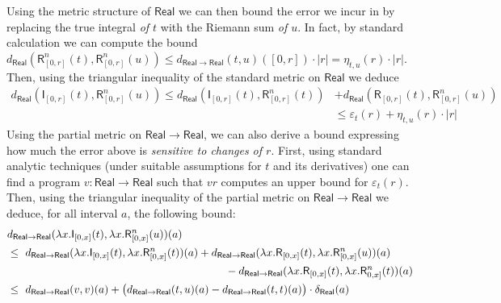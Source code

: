 \begin{example}
Using the metric structure of $\mathsf{Real}$ we can then bound the error we incur in by replacing the true integral \emph{of $t$} with the Riemann sum \emph{of $u$}. 
In fact, by standard calculation we can compute the bound
$d_{\mathsf{Real}} ( \mathsf{R}^{n}_{[0,r]}(t), \mathsf R^{n}_{[0,r]}(u))\leq 
d_{\mathsf{Real}\to\mathsf{Real}}(t, u)([0,r]) \cdot |r|=\eta_{t,u}(r) \cdot |r|$.
Then, using the triangular inequality of the standard metric on $\mathsf{Real}$ we deduce
\begin{align*}
 d_{\mathsf{Real}} ( \mathsf{I}_{[0,r]}(t), \mathsf R^{n}_{[0,r]}(u)) \leq
d_{\mathsf{Real}} ( \mathsf{I}_{[0,r]}(t), \mathsf R^{n}_{[0,r]}(t))  & +
d_{\mathsf{Real}} ( \mathsf{R}_{[0,r]}(t),\mathsf R^{n}_{[0,r]}(u)) \\
& \leq \varepsilon_{t}(r)
+ 
\eta_{t,u}(r)\cdot 
  |r|
 \end{align*}
 Using the partial metric on $\mathsf{Real}\to \mathsf{Real}$, we can also derive a bound expressing how much the error above is \emph{sensitive to changes of $r$}. 
First, using standard analytic techniques (under suitable assumptions for $t$ and its derivatives) one can find a program $v:\mathsf{Real}\to\mathsf{Real}$ such that $vr $ computes an upper bound for $\varepsilon_{t}(r)$. 
Then, using the triangular inequality of the partial metric on $\mathsf{Real}\to \mathsf{Real}$ we deduce, for all interval $a$, the following bound:
\begin{align*}
& d_{\mathsf{Real}\to\mathsf{Real}} (\lambda x. \mathsf{I}_{[0,x]}(t),\lambda x. \mathsf R^{n}_{[0,x]}(u))(a) \\
 &\leq \
d_{\mathsf{Real}\to\mathsf{Real}} ( \lambda x.\mathsf{I}_{[0,x]}(t), \lambda x.\mathsf R^{n}_{[0,x]}(t))(a) +
d_{\mathsf{Real}\to\mathsf{Real}} ( \lambda x.\mathsf{R}_{[0,x]}(t), \lambda x.\mathsf R^{n}_{[0,x]}(u))(a) \\
 & \qquad\qquad\qquad\qquad\qquad\qquad\qquad\qquad\qquad\qquad
- d_{\mathsf{Real}\to\mathsf{Real}} ( \lambda x.\mathsf{R}_{[0,x]}(t), \allowbreak \lambda x. \mathsf R^{n}_{0,x]}(t))(a) \\
 & \leq \ 
d_{\mathsf{Real}\to \mathsf{Real}}(v,v)(a)
 +
 \big( d_{\mathsf{Real}\to\mathsf{Real}}(t,u)(a)- d_{\mathsf{Real}\to\mathsf{Real}}(t,t)(a)\big)\cdot \diam_{\mathsf{Real}}(a)
\end{align*}
\end{example}





